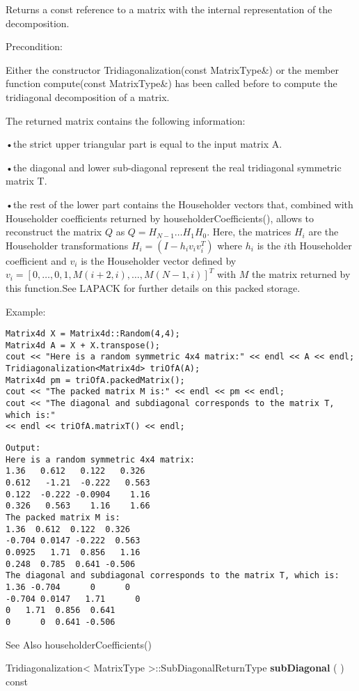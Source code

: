 Returns a const reference to a matrix with the internal representation of the decomposition.

Precondition:

Either the constructor Tridiagonalization(const MatrixType\&) or the member function compute(const MatrixType\&) has been called before to compute the tridiagonal decomposition of a matrix.

The returned matrix contains the following information:

•the strict upper triangular part is equal to the input matrix A.

•the diagonal and lower sub-diagonal represent the real tridiagonal symmetric matrix T.

•the rest of the lower part contains the Householder vectors that, combined with Householder coefficients returned by householderCoefficients(), allows to reconstruct the matrix $Q$ as $Q = H_{N-1}\ldots H_1 H_0$. Here, the matrices $H_i$ are the Householder transformations $H_i=(I - h_i v_i v_i^T)$ where $h_i$  is the $i$th Householder coefficient and $v_i$ is the Householder vector defined by $v_i=[0,\ldots,0,1,M(i+2,i),\ldots,M(N-1,i)]^T$ with $M$ the matrix returned by this function.See LAPACK for further details on this packed storage.


Example:
\begin{lstlisting}
Matrix4d X = Matrix4d::Random(4,4);
Matrix4d A = X + X.transpose();
cout << "Here is a random symmetric 4x4 matrix:" << endl << A << endl;
Tridiagonalization<Matrix4d> triOfA(A);
Matrix4d pm = triOfA.packedMatrix();
cout << "The packed matrix M is:" << endl << pm << endl;
cout << "The diagonal and subdiagonal corresponds to the matrix T, which is:"
<< endl << triOfA.matrixT() << endl;
\end{lstlisting}

\begin{verbatim}			
Output:
Here is a random symmetric 4x4 matrix:
1.36   0.612   0.122   0.326
0.612   -1.21  -0.222   0.563
0.122  -0.222 -0.0904    1.16
0.326   0.563    1.16    1.66
The packed matrix M is:
1.36  0.612  0.122  0.326
-0.704 0.0147 -0.222  0.563
0.0925   1.71  0.856   1.16
0.248  0.785  0.641 -0.506
The diagonal and subdiagonal corresponds to the matrix T, which is:
1.36 -0.704      0      0
-0.704 0.0147   1.71      0
0   1.71  0.856  0.641
0      0  0.641 -0.506
\end{verbatim}		
See Also householderCoefficients() 


\vspace{0.3cm}
Tridiagonalization< MatrixType >::SubDiagonalReturnType \textbf{subDiagonal}  ( )  const 


